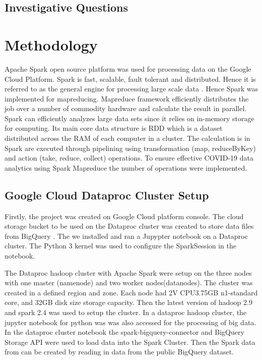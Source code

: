 \documentclass[12pt,letterpaper, twoside]{article}
\begin{document}
\subsection{Investigative Questions}


\section{Methodology}
Apache Spark open source platform was used for processing data on the Google Cloud Platform. Spark is fast, scalable, fault tolerant and distributed. Hence it is referred to as the general engine for processing large scale data  \cite{Chouksey and Chauhan, 2017}. Hence Spark was implemented for mapreducing. Mapreduce framework efficiently distributes the job over a number of commodity hardware and calculate the result in parallel. Spark can efficiently analyzes large data sets since it relies on in-memory storage for computing. Its main core data structure is RDD which is a dataset distributed across the RAM  of each computer in a cluster. The calculation is in Spark are executed through pipelining using transformation (map, reduceByKey) and action (take, reduce, collect) operations. To ensure effective COVID-19 data analytics using Spark Mapreduce the number of operations were implemented.

\subsection{ Google Cloud Dataproc Cluster Setup}
Firstly, the project was created on Google Cloud platform console. The cloud storage bucket to be used on the Dataproc cluster was created to store data files from BigQuery . The we installed and ran a Jupypter notebook on a Dataproc cluster. The Python 3 kernel was used to configure the SparkSession in the notebook. 

The Dataproc hadoop cluster with Apache Spark were setup on the three nodes with one master (namenode) and two worker nodes(datanodes). The cluster was created in a defined region and zone. Each node had 2V CPU3.75GB n1-standard core, and 32GB disk size storage capacity. Then the latest version of hadoop 2.9 and spark 2.4 was used to setup the cluster. In a dataproc hadoop cluster, the jupyter notebook for python was was also accessed for the processing of big data.  In the dataproc cluster notebook the spark-bigquery-connector and BigQuery Storage API were used to  load data into the Spark Cluster. Then the Spark data from can be created by reading in data from the public BigQuery dataset. 
\end{document}
